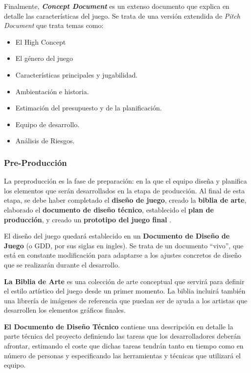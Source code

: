 Finalmente, \textbf{\textit{Concept Document}} es un extenso documento que explica en detalle las características del juego. Se trata de una versión extendida de \textit{Pitch Document} que trata temas como: 
\begin{itemize}
\item El High Concept
\item El género del juego
\item Características principales y jugabilidad.
\item Ambientación e historia.
\item Estimación del presupuesto y de la planificación.
\item Equipo de desarrollo.
\item Análisis de Riesgos.
\end{itemize}

\subsubsection{Pre-Producción}
La preproducción es la fase de preparación: en la que el equipo diseña y planifica los elementos que serán desarrollados en la etapa de producción. Al final de esta etapa, se debe haber completado el \textbf{diseño de juego}, creado la \textbf{biblia de arte}, elaborado el \textbf{documento de diseño técnico}, establecido el \textbf{plan de producción}, y creado un \textbf{prototipo del juego final} \cite{game_design_2}.

El diseño del juego quedará establecido en un \textbf{Documento de Diseño de Juego} (o GDD, por sus siglas en ingles). Se trata de un documento ``vivo'', que está en constante modificación para adaptarse a los ajustes concretos de diseño que se realizarán durante el desarrollo.

\textbf{La Biblia de Arte} es una colección de arte conceptual que servirá para definir el estilo artístico del juego desde un primer momento. La biblia incluirá también una librería de imágenes de referencia que puedan ser de ayuda a los artistas que desarrollen los elementos gráficos finales.

\textbf{El Documento de Diseño Técnico} contiene una descripción en detalle la parte técnica del proyecto definiendo las tareas que los desarrolladores deberán afrontar, estimando el coste que dichas tareas tendrán tanto en tiempo como en número de personas y especificando las herramientas y técnicas que utilizará el equipo.

